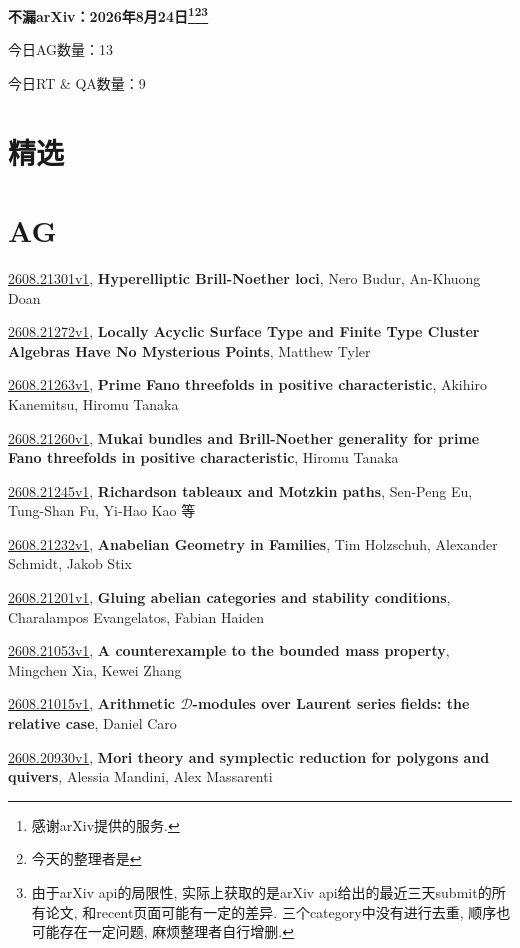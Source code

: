 \documentclass[9pt, a4paper]{article}
\theoremstyle{plain}
\theoremstyle{definition}
\theoremstyle{remark}
\newcommand{\arxiv}[3]{\href{https://arxiv.org/abs/#1}{#1}, \textbf{\textcolor{arxivblue}{#2}}, #3}
\newcommand{\AGnumber}{13}
\newcommand{\RTQAnumber}{9}
\newcommand{\NewestDate}{2026年8月24日}
\newcommand{\todayarXiver}{} %
\begin{document}
\begin{center}
    \Huge\textbf{不漏arXiv：\NewestDate\footnote{感谢arXiv提供的服务.}\footnote{今天的整理者是\todayarXiver}\footnote{由于arXiv api的局限性, 实际上获取的是arXiv api给出的最近三天submit的所有论文, 和recent页面可能有一定的差异. 三个category中没有进行去重, 顺序也可能存在一定问题, 麻烦整理者自行增删.}} \\
\end{center}

\setcounter{section}{-1}

\begin{center}
    今日AG数量：\AGnumber
    
    今日RT \& QA数量：\RTQAnumber
    
\end{center}


\section{精选}


\section{AG}
\arxiv{2608.21301v1}{Hyperelliptic Brill-Noether loci}{Nero Budur, An-Khuong Doan}

\arxiv{2608.21272v1}{Locally Acyclic Surface Type and Finite Type Cluster Algebras Have No Mysterious Points}{Matthew Tyler}

\arxiv{2608.21263v1}{Prime Fano threefolds in positive characteristic}{Akihiro Kanemitsu, Hiromu Tanaka}

\arxiv{2608.21260v1}{Mukai bundles and Brill-Noether generality for prime Fano threefolds in positive characteristic}{Hiromu Tanaka}

\arxiv{2608.21245v1}{Richardson tableaux and Motzkin paths}{Sen-Peng Eu, Tung-Shan Fu, Yi-Hao Kao 等}

\arxiv{2608.21232v1}{Anabelian Geometry in Families}{Tim Holzschuh, Alexander Schmidt, Jakob Stix}

\arxiv{2608.21201v1}{Gluing abelian categories and stability conditions}{Charalampos Evangelatos, Fabian Haiden}

\arxiv{2608.21053v1}{A counterexample to the bounded mass property}{Mingchen Xia, Kewei Zhang}

\arxiv{2608.21015v1}{Arithmetic $\mathcal{D}$-modules over Laurent series fields: the relative case}{Daniel Caro}

\arxiv{2608.20930v1}{Mori theory and symplectic reduction for polygons and quivers}{Alessia Mandini, Alex Massarenti}
\end{document}
